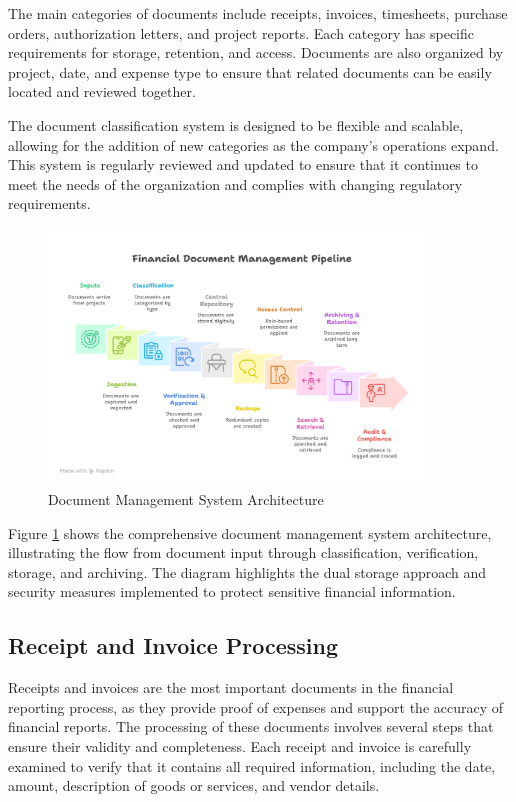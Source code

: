 The main categories of documents include receipts, invoices, timesheets, purchase orders, authorization letters, and project reports. Each category has specific requirements for storage, retention, and access. Documents are also organized by project, date, and expense type to ensure that related documents can be easily located and reviewed together.

The document classification system is designed to be flexible and scalable, allowing for the addition of new categories as the company's operations expand. This system is regularly reviewed and updated to ensure that it continues to meet the needs of the organization and complies with changing regulatory requirements.

\begin{figure}[H]
    \centering
    \includegraphics[width=0.9\textwidth]{assets/images/document_management.png}
    \caption{Document Management System Architecture}
    \label{fig:document_management}
\end{figure}

Figure \ref{fig:document_management} shows the comprehensive document management system architecture, illustrating the flow from document input through classification, verification, storage, and archiving. The diagram highlights the dual storage approach and security measures implemented to protect sensitive financial information.

\subsection{Receipt and Invoice Processing}
Receipts and invoices are the most important documents in the financial reporting process, as they provide proof of expenses and support the accuracy of financial reports. The processing of these documents involves several steps that ensure their validity and completeness. Each receipt and invoice is carefully examined to verify that it contains all required information, including the date, amount, description of goods or services, and vendor details.

